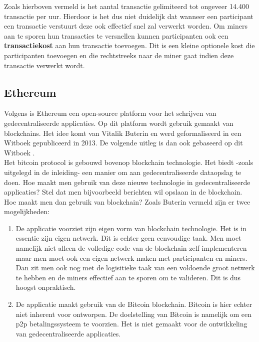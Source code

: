 Zoals hierboven vermeld is het aantal transactie gelimiteerd tot ongeveer 14.400 transactie per uur. Hierdoor is het dus niet duidelijk dat wanneer een participant een transactie verstuurt deze ook effectief snel zal verwerkt worden. Om miners aan te sporen hun transacties te versnellen kunnen participanten ook een \textbf{transactiekost} aan hun transactie toevoegen.  Dit is een kleine optionele kost die participanten toevoegen en die rechtstreeks naar de miner gaat indien deze transactie verwerkt wordt.

\subsection{Ethereum}
Volgens \cite{EthFound2020} is Ethereum een open-source platform voor het schrijven van gedecentraliseerde applicaties. Op dit platform wordt gebruik gemaakt van blockchains. Het idee komt van Vitalik Buterin en werd geformaliseerd in een Witboek gepubliceerd in 2013. De volgende uitleg is dan ook gebaseerd op dit Witboek \cite{Buterin2015}.\\

Het bitcoin protocol is gebouwd bovenop blockchain technologie. Het biedt -zoals uitgelegd in de inleiding- een manier om aan gedecentraliseerde dataopslag te doen. Hoe maakt men gebruik van deze nieuwe technologie in gedecentraliseerde applicaties? Stel dat men bijvoorbeeld berichten wil opslaan in de blockchain. Hoe maakt men dan gebruik van blockchain? Zoals Buterin vermeld zijn er twee mogelijkheden:

\begin{enumerate}
\item De applicatie voorziet zijn eigen vorm van blockchain technologie. Het is in essentie zijn eigen netwerk. Dit is echter geen eenvoudige taak. Men moet namelijk niet alleen de volledige code van de blockchain zelf  implementeren maar men moet ook een eigen netwerk maken met participanten en miners. Dan zit men ook nog met de logisitieke taak van een voldoende groot netwerk te hebben en de miners effectief aan te sporen om te valideren. Dit is dus hoogst onpraktisch.\\
\item De applicatie maakt gebruik van de Bitcoin blockchain. Bitcoin is hier echter niet inherent voor ontworpen. De doelstelling van Bitcoin is namelijk om een p2p betalingssysteem te voorzien. Het is niet gemaakt voor de ontwikkeling van gedecentraliseerde applicaties.\\
\end{enumerate}

